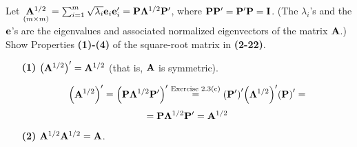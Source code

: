         Let $\underset{\left(m \times m\right)}{\bold{A}^{1/2}} = \sum_{i=1}^m{\sqrt{\lambda_i} \bold{e}_i \bold{e}_i^\prime} = \bold{P}\bold{\Lambda}^{1/2}\bold{P}^\prime$, where $\bold{P}\bold{P}^\prime = \bold{P}^\prime\bold{P} = \bold{I}$. (The $\lambda_i$'s and the $\bold{e}$'s are the eigenvalues and associated normalized eigenvectors of the matrix $\bold{A}$.) Show Properties \textbf{(1)-(4)} of the square-root matrix in \textbf{(2-22)}.
        \begin{enumerate}
            \item[\textbf{(1)}]{${\left(\bold{A}^{1/2}\right)}^\prime = \bold{A}^{1/2}$ (that is, $\bold{A}$ is symmetric).}
            
            \[
                {\left(\bold{A}^{1/2}\right)}^\prime
                =
                {\left(\bold{P}\bold{\Lambda}^{1/2}\bold{P}^\prime\right)}^\prime
                \overset{\text{Exercise 2.3(c)}}{=}
                {\left(\bold{P}^\prime\right)}^\prime {\left(\bold{\Lambda}^{1/2}\right)}^\prime {\left(\bold{P}\right)}^\prime
                =
            \]
            \[
                =
                \bold{P} \bold{\Lambda}^{1/2} \bold{P}^\prime
                =
                \bold{A}^{1/2}
            \]

            \item[\textbf{(2)}]{$\bold{A}^{1/2}\bold{A}^{1/2} = \bold{A}$.}
            

\end{enumerate}

